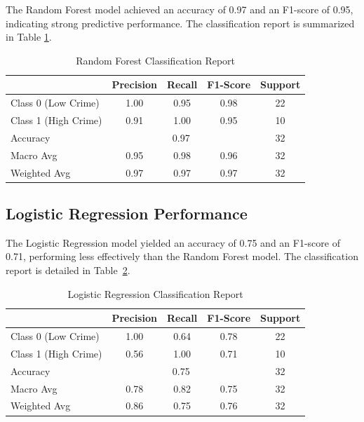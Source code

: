 \documentclass{report}
\begin{document}
\par The Random Forest model achieved an accuracy of 0.97 and an F1-score of 0.95, indicating strong predictive performance. The classification report is summarized in Table \ref{tab:rf_classification_report}.


\begin{table}[h!]
  \centering
  \caption{Random Forest Classification Report}
  \label{tab:rf_classification_report}
  \begin{tabular}{lcccc}
    \toprule
    & Precision & Recall & F1-Score & Support \\
    \midrule
    Class 0 (Low Crime) & 1.00 & 0.95 & 0.98 & 22 \\
    Class 1 (High Crime) & 0.91 & 1.00 & 0.95 & 10 \\
    \midrule
    Accuracy & \multicolumn{3}{c}{0.97} & 32 \\
    Macro Avg & 0.95 & 0.98 & 0.96 & 32 \\
    Weighted Avg & 0.97 & 0.97 & 0.97 & 32 \\
    \bottomrule
  \end{tabular}
\end{table}

\subsection{Logistic Regression Performance}
The Logistic Regression model yielded an accuracy of 0.75 and an F1-score of 0.71, performing less effectively than the Random Forest model. The classification report is detailed in Table~\ref{tab:lr_classification_report}.

\begin{table}[h!]
\centering
\caption{Logistic Regression Classification Report}
\label{tab:lr_classification_report}
\begin{tabular}{lcccc}
\toprule
 & Precision & Recall & F1-Score & Support \\
\midrule
Class 0 (Low Crime) & 1.00 & 0.64 & 0.78 & 22 \\
Class 1 (High Crime) & 0.56 & 1.00 & 0.71 & 10 \\
\midrule
Accuracy & \multicolumn{3}{c}{0.75} & 32 \\
Macro Avg & 0.78 & 0.82 & 0.75 & 32 \\
Weighted Avg & 0.86 & 0.75 & 0.76 & 32 \\
\bottomrule
\end{tabular}
\end{table}
\end{document}
